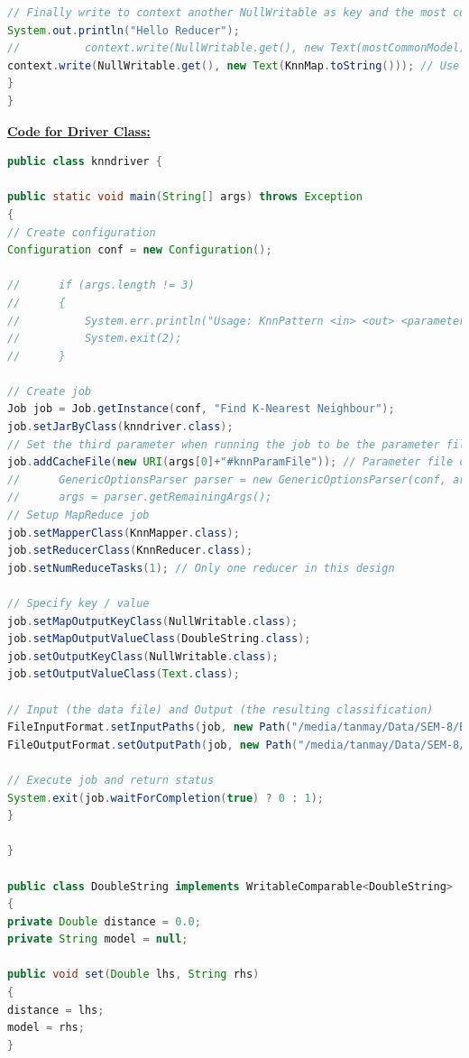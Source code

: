 \documentclass[11pt,article]{memoir}
\begin{document}
\begin{flushleft}
\begin{lstlisting}[language=java]
// Finally write to context another NullWritable as key and the most common model just counted as value.
System.out.println("Hello Reducer");
//			context.write(NullWritable.get(), new Text(mostCommonModel)); // Use this line to produce a single classification
context.write(NullWritable.get(), new Text(KnnMap.toString()));	// Use this line to see all K nearest neighbours and distances
}
}

\end{lstlisting}

\textbf{\underline{Code for Driver Class:}}
\begin{lstlisting}[language=java]
public class knndriver {

public static void main(String[] args) throws Exception
{
// Create configuration
Configuration conf = new Configuration();

//		if (args.length != 3)
//		{
//			System.err.println("Usage: KnnPattern <in> <out> <parameter file>");
//			System.exit(2);
//		}

// Create job
Job job = Job.getInstance(conf, "Find K-Nearest Neighbour");
job.setJarByClass(knndriver.class);
// Set the third parameter when running the job to be the parameter file and give it an alias
job.addCacheFile(new URI(args[0]+"#knnParamFile")); // Parameter file containing test data
//		GenericOptionsParser parser = new GenericOptionsParser(conf, args);
//		args = parser.getRemainingArgs();
// Setup MapReduce job
job.setMapperClass(KnnMapper.class);
job.setReducerClass(KnnReducer.class);
job.setNumReduceTasks(1); // Only one reducer in this design

// Specify key / value
job.setMapOutputKeyClass(NullWritable.class);
job.setMapOutputValueClass(DoubleString.class);
job.setOutputKeyClass(NullWritable.class);
job.setOutputValueClass(Text.class);

// Input (the data file) and Output (the resulting classification)
FileInputFormat.setInputPaths(job, new Path("/media/tanmay/Data/SEM-8/BDA/EXP8/Exp8bda1920/CarOwners.csv"));
FileOutputFormat.setOutputPath(job, new Path("/media/tanmay/Data/SEM-8/BDA/EXP8/Exp8bda1920/out"));

// Execute job and return status
System.exit(job.waitForCompletion(true) ? 0 : 1);
}

}

public class DoubleString implements WritableComparable<DoubleString>
{
private Double distance = 0.0;
private String model = null;

public void set(Double lhs, String rhs)
{
distance = lhs;
model = rhs;
}


\end{lstlisting}
\end{flushleft}
\end{document}
